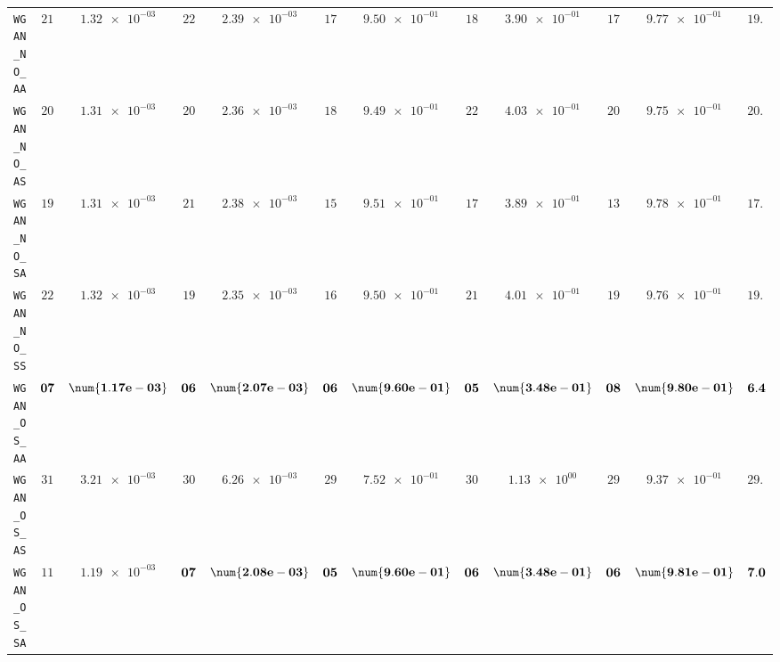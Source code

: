 \begin{xltabular}{\textwidth}{l||cC|cC|cC|cC|cC||c}
	\texttt{WGAN\_NO\_AA} & $ 21$ & $ \num{1.32e-03}$ & $ 22$ & $ \num{2.39e-03}$ & $ 17$ & $ \num{9.50e-01}$ & $ 18$ & $ \num{3.90e-01}$ & $ 17$ & $ \num{9.77e-01}$ & $ 19.0$  \\
	\texttt{WGAN\_NO\_AS} & $ 20$ & $ \num{1.31e-03}$ & $ 20$ & $ \num{2.36e-03}$ & $ 18$ & $ \num{9.49e-01}$ & $ 22$ & $ \num{4.03e-01}$ & $ 20$ & $ \num{9.75e-01}$ & $ 20.0$  \\
	\texttt{WGAN\_NO\_SA} & $ 19$ & $ \num{1.31e-03}$ & $ 21$ & $ \num{2.38e-03}$ & $ 15$ & $ \num{9.51e-01}$ & $ 17$ & $ \num{3.89e-01}$ & $ 13$ & $ \num{9.78e-01}$ & $ 17.0$  \\
	\texttt{WGAN\_NO\_SS} & $ 22$ & $ \num{1.32e-03}$ & $ 19$ & $ \num{2.35e-03}$ & $ 16$ & $ \num{9.50e-01}$ & $ 21$ & $ \num{4.01e-01}$ & $ 19$ & $ \num{9.76e-01}$ & $ 19.4$  \\
	\texttt{WGAN\_OS\_AA} & $\bf 07$ & $\bf \num{1.17e-03}$ & $\bf 06$ & $\bf \num{2.07e-03}$ & $\bf 06$ & $\bf \num{9.60e-01}$ & $\bf 05$ & $\bf \num{3.48e-01}$ & $\bf 08$ & $\bf \num{9.80e-01}$ & $\bf 6.4$  \\
	\texttt{WGAN\_OS\_AS} & $ 31$ & $ \num{3.21e-03}$ & $ 30$ & $ \num{6.26e-03}$ & $ 29$ & $ \num{7.52e-01}$ & $ 30$ & $ \num{1.13e+00}$ & $ 29$ & $ \num{9.37e-01}$ & $ 29.8$  \\
	\texttt{WGAN\_OS\_SA} & $ 11$ & $ \num{1.19e-03}$ & $\bf 07$ & $\bf \num{2.08e-03}$ & $\bf 05$ & $\bf \num{9.60e-01}$ & $\bf 06$ & $\bf \num{3.48e-01}$ & $\bf 06$ & $\bf \num{9.81e-01}$ & $\bf 7.0$  \\

\end{xltabular}
